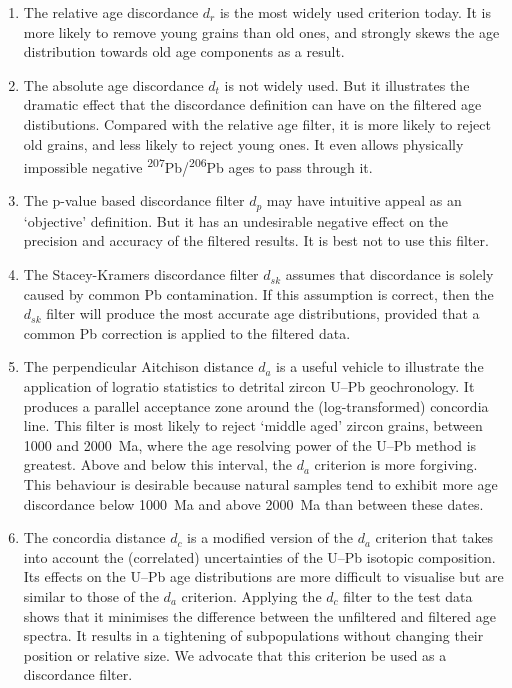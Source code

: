 \documentclass[gchron, manuscript]{copernicus}
\begin{document}
\begin{enumerate}
  \item The relative age discordance $d_r$ is the most widely used
    criterion today. It is more likely to remove young grains than old
    ones, and strongly skews the age distribution towards old age
    components as a result.
  \item The absolute age discordance $d_t$ is not widely used. But it
    illustrates the dramatic effect that the discordance definition
    can have on the filtered age distibutions. Compared with the
    relative age filter, it is more likely to reject old grains, and
    less likely to reject young ones. It even allows physically
    impossible negative
    \textsuperscript{207}Pb/\textsuperscript{206}Pb ages to pass
    through it.
  \item The p-value based discordance filter $d_p$ may have intuitive
    appeal as an `objective' definition. But it has an undesirable
    negative effect on the precision and accuracy of the filtered
    results. It is best not to use this filter.
  \item The Stacey-Kramers discordance filter $d_{sk}$ assumes that
    discordance is solely caused by common Pb contamination. If this
    assumption is correct, then the $d_{sk}$ filter will produce the
    most accurate age distributions, provided that a
    \citet{stacey1975} common Pb correction is applied to the filtered
    data.
  \item The perpendicular Aitchison distance $d_a$ is a useful vehicle
    to illustrate the application of logratio statistics to detrital
    zircon U--Pb geochronology. It produces a parallel acceptance zone
    around the (log-transformed) concordia line. This filter is most
    likely to reject `middle aged' zircon grains, between 1000 and
    2000~Ma, where the age resolving power of the U--Pb method is
    greatest. Above and below this interval, the $d_a$ criterion is
    more forgiving. This behaviour is desirable because natural
    samples tend to exhibit more age discordance below 1000~Ma and
    above 2000~Ma than between these dates.
  \item The concordia distance $d_c$ is a modified version of the
    $d_a$ criterion that takes into account the (correlated)
    uncertainties of the U--Pb isotopic composition.  Its effects on
    the U--Pb age distributions are more difficult to visualise but
    are similar to those of the $d_a$ criterion.  Applying the $d_c$
    filter to the test data shows that it minimises the difference
    between the unfiltered and filtered age spectra. It results in a
    tightening of subpopulations without changing their position or
    relative size. We advocate that this criterion be used as a
    discordance filter.
\end{enumerate}
\end{document}
